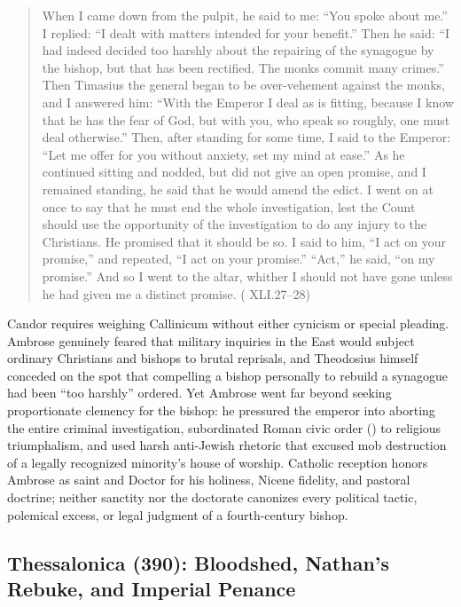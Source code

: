 \begin{quote}
When I came down from the pulpit, he said to me: ``You spoke about me.'' I replied: ``I dealt with matters intended for your benefit.'' Then he said: ``I had indeed decided too harshly about the repairing of the synagogue by the bishop, but that has been rectified. The monks commit many crimes.'' Then Timasius the general began to be over-vehement against the monks, and I answered him: ``With the Emperor I deal as is fitting, because I know that he has the fear of God, but with you, who speak so roughly, one must deal otherwise.'' Then, after standing for some time, I said to the Emperor: ``Let me offer for you without anxiety, set my mind at ease.'' As he continued sitting and nodded, but did not give an open promise, and I remained standing, he said that he would amend the edict. I went on at once to say that he must end the whole investigation, lest the Count should use the opportunity of the investigation to do any injury to the Christians. He promised that it should be so. I said to him, ``I act on your promise,'' and repeated, ``I act on your promise.'' ``Act,'' he said, ``on my promise.'' And so I went to the altar, whither I should not have gone unless he had given me a distinct promise. ( XLI.27--28)
\end{quote}

Candor requires weighing Callinicum without either cynicism or special pleading. Ambrose genuinely feared that military inquiries in the East would subject ordinary Christians and bishops to brutal reprisals, and Theodosius himself conceded on the spot that compelling a bishop personally to rebuild a synagogue had been ``too harshly'' ordered. Yet Ambrose went far beyond seeking proportionate clemency for the bishop: he pressured the emperor into aborting the entire criminal investigation, subordinated Roman civic order () to religious triumphalism, and used harsh anti-Jewish rhetoric that excused mob destruction of a legally recognized minority's house of worship. Catholic reception honors Ambrose as saint and Doctor for his holiness, Nicene fidelity, and pastoral doctrine; neither sanctity nor the doctorate canonizes every political tactic, polemical excess, or legal judgment of a fourth-century bishop.

\subsection{Thessalonica (390): Bloodshed, Nathan's Rebuke, and Imperial Penance}


